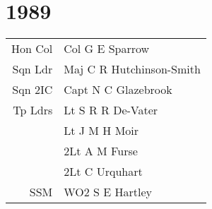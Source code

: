 \chapter*{1989}

\begin{center}
  \begin{tabular}{rl}
    Hon Col & Col G E Sparrow \\
    Sqn Ldr & Maj C R Hutchinson-Smith \\
    Sqn 2IC & Capt N C Glazebrook \\
    Tp Ldrs & Lt S R R De-Vater \\
     & Lt J M H Moir \\
     & 2Lt A M Furse \\
     & 2Lt C Urquhart \\
    SSM & WO2 S E Hartley \\
  \end{tabular}
\end{center}

